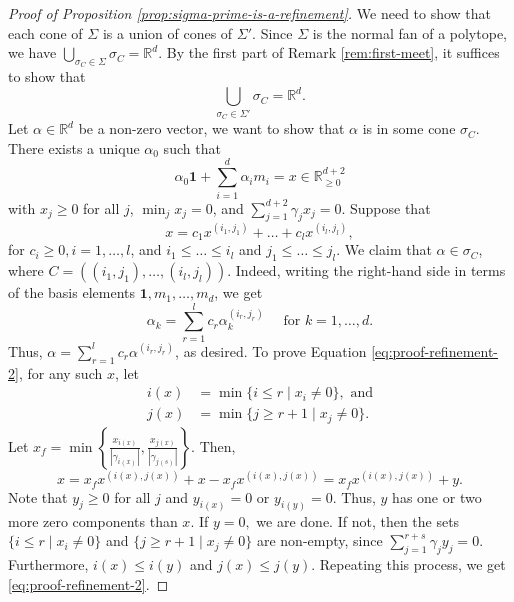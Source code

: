 \documentclass[11pt, reqno]{amsart}
\theoremstyle{plain}
\theoremstyle{definition}
\newcommand{\R}{\mathbb{R}}
\newcommand{\ga}{\gamma}
\newcommand{\al}{\alpha}
\begin{document}
\begin{proof}[Proof of Proposition \ref{prop:sigma-prime-is-a-refinement}]
We need to show that each cone of $\Sigma$ is a union of cones of $\Sigma'$.
Since $\Sigma$ is the normal fan of a polytope, we have $\bigcup_{\sigma_C \in \Sigma} \sigma_C = \R^{d}$.
By the first part of Remark \ref{rem:first-meet}, it suffices to show that
\[
\bigcup_{\sigma_C \in \Sigma'} \sigma_C =\R^{d}.
\]
Let $\al \in \R^{d}$ be a non-zero vector, we want to show that $\al$ is in some cone $\sigma_C$. There exists a unique $\al_0$ such that 
\begin{equation}\label{eq:proof-refinement-1}
    \al_0 \mathbf{1} + \sum_{i=1}^{d} \al_i m_i = x \in \R^{d+2}_{\ge 0}
\end{equation}
with $x_j \ge 0$ for all $j$, $\min_{j} x_j =0$, and $ \sum_{j=1}^{d+2}\ga_j x_j=0$.
Suppose that
\begin{equation} \label{eq:proof-refinement-2}
x= c_1 x^{(i_1,j_1)}+ \dots +c_{l} x^{(i_l,j_l)},
\end{equation}
for $c_i \ge 0 ,i=1,\dots, l$, and $i_1 \le \dots \le i_l$ and $j_1 \le \dots \le j_l$. We claim that $\al \in \sigma_C$, where $C = ((i_1,j_1),\dots,(i_l,j_l)).$
Indeed, writing the right-hand side in terms of the basis elements $ \mathbf{1}, m_1, \dots,m_d$, we get
\[
\al_k= \sum_{r=1}^{l} c_r \al_k ^{(i_r,j_r)}  \quad \text{ for } k=1,\dots, d. 
\]
Thus, $\al = \sum_{r=1}^l c_r \al^{(i_r,j_r)}$, as desired.
To prove Equation \eqref{eq:proof-refinement-2}, for any such $x$, let
\begin{align*}
    i(x) &= \min \{ i \le r \mid x_i \neq 0\}, \text{ and}\\
    j(x) &= \min \{ j \ge r+1  \mid x_j \neq 0\}.
\end{align*}
Let $x_f= \min\left\{ \frac{x_{i(x)}}{|\ga_{i(x)}|}, \frac{x_{j(x)}}{|\ga_{j(s)}|}\right\}$. Then, 
\[
x= x_f x^{(i(x),j(x))} + x- x_f x^{(i(x),j(x))}  = x_f x^{(i(x),j(x))} + y.
\]
Note that $y_j \ge 0$ for all $j$ and $y_{i(x)}=0$ or $y_{i(y)}=0$.
Thus, $y$ has one or two more zero components than $x$. 
If $y=0,$ we are done. If not, then the sets $ \{ i \le r \mid x_i \neq 0\}$ and $ \{ j \ge r+1  \mid x_j \neq 0\}$ are non-empty, since $\sum_{j=1}^{r+s} \ga_j y_j=0$. Furthermore, $i(x) \le i(y)$ and $j(x) \le j(y)$. Repeating this process, we get \eqref{eq:proof-refinement-2}.
\end{proof}
\end{document}
